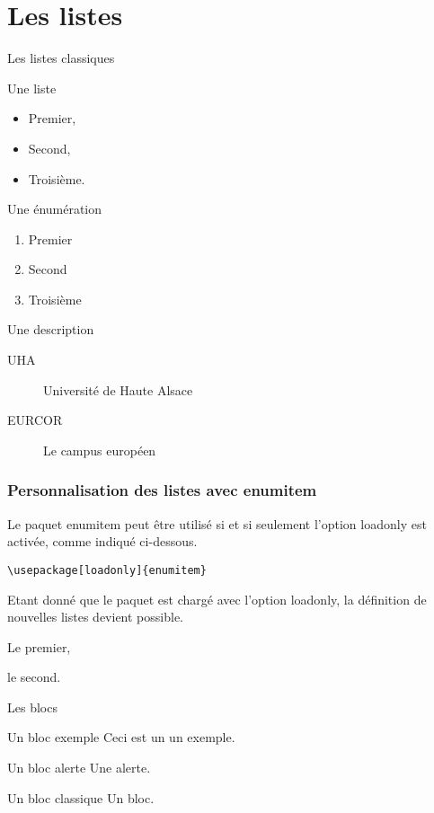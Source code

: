 \documentclass[]{beamer}
\begin{document}
\section{Les listes}
%
\begin{frame}{Les listes classiques}
 	\begin{minipage}[t]{0.45\linewidth}
 		\alert{Une liste}
 		\begin{itemize}
 				\item Premier,
 				\item Second,
				\item Troisième.
 		\end{itemize}
 	\end{minipage}
	\hfill
	\begin{minipage}[t]{0.45\linewidth}
		\alert{Une énumération}
		\begin{enumerate}
				\item Premier
				\item Second
				\item Troisième
		\end{enumerate}
	\end{minipage}

	\vspace{2em}

	\alert{Une description}
	\begin{description}
			\item [UHA] Université de Haute Alsace
			\item [EURCOR] Le campus européen
	\end{description}
\end{frame}
%
\begin{frame}[fragile]
	\frametitle{Personnalisation des listes avec enumitem}
	Le paquet \alert{enumitem} peut être utilisé si et si seulement l'option \alert{loadonly} est activée, comme indiqué ci-dessous.
\begin{verbatim}
\usepackage[loadonly]{enumitem}
\end{verbatim}
	Etant donné que le paquet est chargé avec l'option \alert{loadonly}, la définition de nouvelles listes devient possible.
	\begin{perso}
			\item Le premier,
			\item le second.
	\end{perso}
\end{frame}
%
\begin{frame}{Les blocs}
	\begin{exampleblock}{Un bloc exemple}
		Ceci est un un exemple.
	\end{exampleblock}

	\begin{alertblock}{Un bloc alerte}
		Une alerte.
	\end{alertblock}

	\begin{block}{Un bloc classique}
		Un bloc.
	\end{block}
\end{frame}
\end{document}
